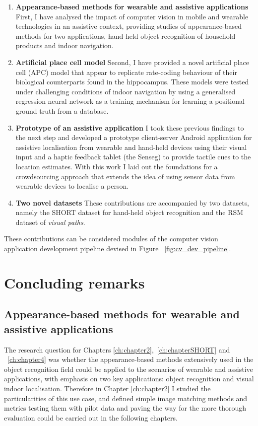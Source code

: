 \begin{enumerate}
\item \textbf{Appearance-based methods for wearable and assistive applications} First, I have analysed the impact of computer vision in mobile and wearable technologies in an assistive context, providing studies of appearance-based methods for two applications, hand-held object recognition of household products and indoor navigation.

\item \textbf{Artificial place cell model} Second, I have provided a novel artificial place cell (APC) model that appear to replicate rate-coding behaviour of their biological counterparts found in the hippocampus. These models were tested under challenging conditions of indoor navigation by using a generalised regression neural network as a training mechanism for learning a positional ground truth from a database.

\item \textbf{Prototype of an assistive application} I took these previous findings to the next step and developed a prototype client-server Android application for assistive localisation from wearable and hand-held devices using their visual input and a haptic feedback tablet (the Senseg\texttrademark) to provide tactile cues to the location estimates. With this work I laid out the foundations for a crowdsourcing approach that extends the idea of using sensor data from wearable devices to localise a person.

\item \textbf{Two novel datasets} These contributions are accompanied by two datasets, namely the SHORT dataset for hand-held object recognition and the RSM dataset of \emph{visual paths}.
\end{enumerate}

These contributions can be considered modules of the computer vision application development pipeline devised in Figure ~\ref{fig:cv_dev_pipeline}.

\section{Concluding remarks}

\subsection{Appearance-based methods for wearable and assistive applications}

The research question for Chapters \ref{ch:chapter2},~\ref{ch:chapterSHORT} and ~\ref{ch:chapter4} was whether the appearance-based methods extensively used in the object recognition field could be applied to the scenarios of wearable and assistive applications, with emphasis on two key applications: object recognition and visual indoor localisation. Therefore in Chapter \ref{ch:chapter2} I studied the particularities of this use case, and defined simple image matching methods and metrics testing them with pilot data and paving the way for the more thorough evaluation could be carried out in the following chapters.

